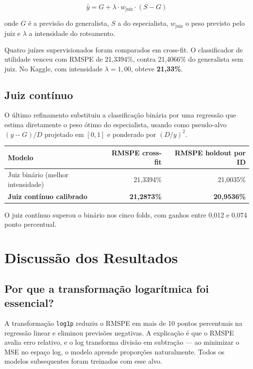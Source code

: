 \documentclass[12pt,a4paper]{article}
\begin{document}
\begin{equation}
\hat{y} = G + \lambda \cdot w_{\text{juiz}} \cdot (S - G)
\end{equation}

\noindent onde $G$ é a previsão do generalista, $S$ a do especialista, $w_{\text{juiz}}$ o peso previsto pelo juiz e $\lambda$ a intensidade do roteamento.

Quatro juízes supervisionados foram comparados em cross-fit. O classificador de utilidade venceu com RMSPE de 21,3394\%, contra 21,4066\% do generalista sem juiz. No Kaggle, com intensidade $\lambda=1{,}00$, obteve \textbf{21,33\%}.

\subsection{Juiz contínuo}

O último refinamento substituiu a classificação binária por uma regressão que estima diretamente o peso ótimo do especialista, usando como pseudo-alvo $(y-G)/D$ projetado em $[0,1]$ e ponderado por $(D/y)^2$.

\begin{table}[h]
\centering
\begin{tabular}{lrr}
\toprule
\textbf{Modelo} & \textbf{RMSPE cross-fit} & \textbf{RMSPE holdout por ID} \\
\midrule
Juiz binário (melhor intensidade) & 21,3394\% & 21,0035\% \\
\textbf{Juiz contínuo calibrado}  & \textbf{21,2873\%} & \textbf{20,9536\%} \\
\bottomrule
\end{tabular}
\end{table}

O juiz contínuo superou o binário nos cinco folds, com ganhos entre 0,012 e 0,074 ponto percentual.

\section{Discussão dos Resultados}

\subsection{Por que a transformação logarítmica foi essencial?}

A transformação \lstinline{log1p} reduziu o RMSPE em mais de 10 pontos percentuais na regressão linear e eliminou previsões negativas. A explicação é que o RMSPE avalia erro relativo, e o log transforma divisão em subtração --- ao minimizar o MSE no espaço log, o modelo aprende proporções naturalmente. Todos os modelos subsequentes foram treinados com esse alvo.
\end{document}
